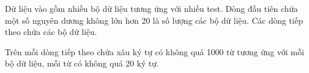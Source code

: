 Dữ liệu vào gồm nhiều bộ dữ liệu tương ứng với nhiều test. Dòng đầu tiên chứa một số nguyên dương không lớn hơn 20 là số lượng các bộ dữ liệu. Các dòng tiếp theo chứa các bộ dữ liệu.  

   Trên mỗi dòng tiếp theo chứa xâu ký tự có không quá 1000 từ tương ứng với mỗi bộ dữ liệu, mỗi từ có không quá 20 ký tự.  

\